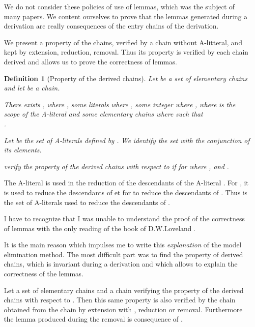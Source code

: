 \documentclass{article}
\newtheorem{definition}[theoreme]{Definition}
\begin{document}
We do not consider these policies of use of lemmas, which was the subject of many papers. We content ourselves to prove
that the lemmas generated during a derivation are really consequences of the entry chains of the derivation.

We present a property of the chains, verified by a chain without A-litteral, and kept by extension, reduction, removal.
Thus its property is verified by each chain derived and allows us to prove the correctness of lemmas.



\begin{definition}[Property of the derived chains]\label{prop-chaine-derivee}
Let  be a set of elementary chains and let  be a chain.

There exists , where ,  some literals  where , 
some integer  where , where  is the scope of the A-literal 
and some elementary chains
  where  such that \\.

Let  be the set of A-literals defined by 
.
We identify the set  with the  \emph{conjunction} of its elements.

 verify the property of the derived chains with respect to  if
for   where ,  and .
\end{definition}

The A-literal  is used in the reduction of the descendants of the A-literal . 
For , it is used to reduce the descendants of  et for  to reduce the descendants of .
Thus  is the set of A-literals used to reduce the descendants of .

I have to recognize that I was unable to understand the proof of the correctness of lemmas with the only reading 
of the book of  D.W.Loveland \cite{Loveland1978}. 

It is the main reason which impulses me to write this \emph{explanation} of the model elimination method.
The most difficult part was to find the property of derived chains, which is invariant during a derivation and which allows
to explain the correctness of the lemmas.



\begin{lemme}\label{invariant-derivation}
Let  a set of elementary chains and  a chain verifying the property of the derived chains with respect to .
Then this same property is also verified by the chain  obtained from the chain  by extension with , reduction 
or removal.
Furthermore the lemma produced during the removal is consequence of .
\end{lemme}
\end{document}
